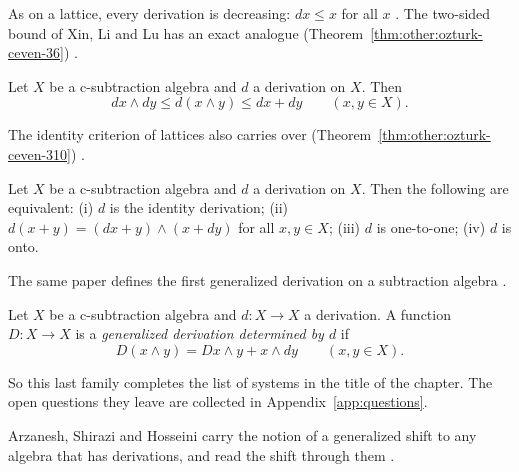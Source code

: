 As on a lattice, every derivation is decreasing: $dx \le x$ for all $x$
\cite[Proposition~3.4, p.~512]{OzturkCeven2009}. The two-sided bound of
Xin, Li and Lu has an exact analogue (Theorem~\ref{thm:other:ozturk-ceven-36})
\cite[Theorem~3.6, p.~512]{OzturkCeven2009}.\begin{theorem}\label{thm:other:ozturk-ceven-36}
Let $X$ be a c-subtraction algebra and $d$ a derivation on $X$. Then
\[
dx \wedge dy \le d(x \wedge y) \le dx + dy
\qquad (x, y \in X).
\]
\end{theorem}

The identity criterion of lattices also carries over (Theorem~\ref{thm:other:ozturk-ceven-310})
\cite[Theorem~3.10, p.~513]{OzturkCeven2009}.\begin{theorem}\label{thm:other:ozturk-ceven-310}
Let $X$ be a c-subtraction algebra and $d$ a derivation on $X$. Then the
following are equivalent: \textup{(i)} $d$ is the identity derivation;
\textup{(ii)} $d(x + y) = (dx + y) \wedge (x + dy)$ for all $x, y \in X$;
\textup{(iii)} $d$ is one-to-one; \textup{(iv)} $d$ is onto.
\end{theorem}

The same paper defines the first generalized derivation on a subtraction
algebra \cite[Definition~3.11, p.~513]{OzturkCeven2009}.

\begin{definition}\label{def:other:subtraction-generalized}
Let $X$ be a c-subtraction algebra and $d \colon X \to X$ a derivation.
A function $D \colon X \to X$ is a \emph{generalized derivation
determined by $d$} if
\[
D(x \wedge y) = Dx \wedge y + x \wedge dy
\qquad (x, y \in X).
\]
\end{definition}

So this last family completes the list of systems in the title of the
chapter. The open questions they leave are collected
in Appendix~\ref{app:questions}.

Arzanesh, Shirazi and Hosseini carry the notion of a generalized shift to any
algebra that has derivations, and read the shift through them
\cite[Abstract, p.~1]{ArzaneshShiraziHosseini2021}.
